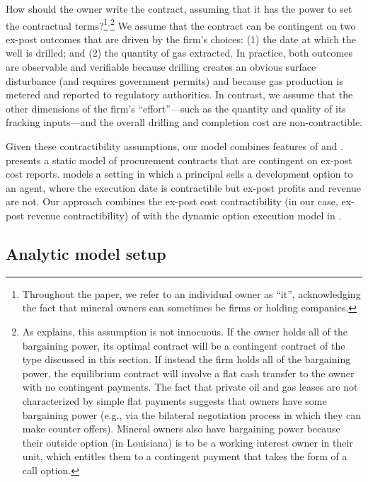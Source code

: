 \documentclass[12pt]{article}
\begin{document}
How should the owner write the contract, assuming that it has the power to set the contractual terms?\footnote{Throughout the paper, we refer to an individual owner as ``it'', acknowledging the fact that mineral owners can sometimes be firms or holding companies.}$^,$\footnote{As \citet{bib:demarzo} explains, this assumption is not innocuous. If the owner holds all of the bargaining power, its optimal contract will be a contingent contract of the type discussed in this section. If instead the firm holds all of the bargaining power, the equilibrium contract will involve a flat cash transfer to the owner with no contingent payments. The fact that private oil and gas leases are not characterized by simple flat payments suggests that owners have some bargaining power (e.g., via the bilateral negotiation process in which they can make counter offers). Mineral owners also have bargaining power because their outside option (in Louisiana) is to be a working interest owner in their unit, which entitles them to a contingent payment that takes the form of a call option.} We assume that the contract can be contingent on two ex-post outcomes that are driven by the firm's choices: (1) the date at which the well is drilled; and (2) the quantity of gas extracted. In practice, both outcomes are observable and verifiable because drilling creates an obvious surface disturbance (and requires government permits) and because gas production is metered and reported to regulatory authorities. In contrast, we assume that the other dimensions of the firm's ``effort''---such as the quantity and quality of its fracking inputs---and the overall drilling and completion cost are non-contractible.

Given these contractibility assumptions, our model combines features of \citet{bib:laffonttirole1986} and \citet{bib:board}. \citet{bib:laffonttirole1986} presents a static model of procurement contracts that are contingent on ex-post cost reports. \citet{bib:board} models a setting in which a principal sells a development option to an agent, where the execution date is contractible but ex-post profits and revenue are not. Our approach combines the ex-post cost contractibility (in our case, ex-post revenue contractibility) of \citet{bib:laffonttirole1986} with the dynamic option execution model in \citet{bib:board}.

\subsection{Analytic model setup \label{sec:Setup}}
\end{document}
